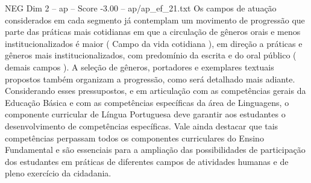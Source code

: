 \begin{textsample}{NEG Dim 2 – ap – Score -3.00 – ap/ap\_ef\_21.txt}
Os campos de atuação considerados em cada segmento já contemplam um movimento de progressão que parte das práticas mais cotidianas em que a circulação de gêneros orais e menos institucionalizados é maior ( Campo da vida cotidiana ), em direção a práticas e gêneros mais institucionalizados, com predomínio da escrita e do oral público ( demais campos ).
A seleção de gêneros, portadores e exemplares textuais propostos também organizam a progressão, como será detalhado mais adiante.
Considerando esses pressupostos, e em articulação com as competências gerais da Educação Básica e com as competências específicas da área de Linguagens, o componente curricular de Língua Portuguesa deve garantir aos estudantes o desenvolvimento de competências específicas.
Vale ainda destacar que tais competências perpassam todos os componentes curriculares do Ensino Fundamental e são essenciais para a ampliação das possibilidades de participação dos estudantes em práticas de diferentes campos de atividades humanas e de pleno exercício da cidadania.

\end{textsample}
